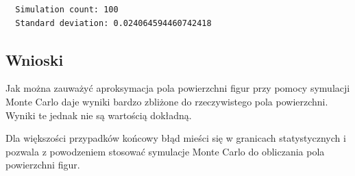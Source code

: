 \documentclass[12pt,oneside,a4paper]{book} %
\theoremstyle{break}
\begin{document}
\begin{verbatim}
  Simulation count: 100
  Standard deviation: 0.024064594460742418
\end{verbatim}

\subsection*{Wnioski}

Jak można zauważyć aproksymacja pola powierzchni figur przy pomocy symulacji Monte Carlo daje wyniki bardzo zbliżone do rzeczywistego pola powierzchni. Wyniki te jednak nie są wartością dokładną.

Dla większości przypadków końcowy błąd mieści się w granicach statystycznych i pozwala z powodzeniem stosować symulacje Monte Carlo do obliczania pola powierzchni figur.
\end{document}
